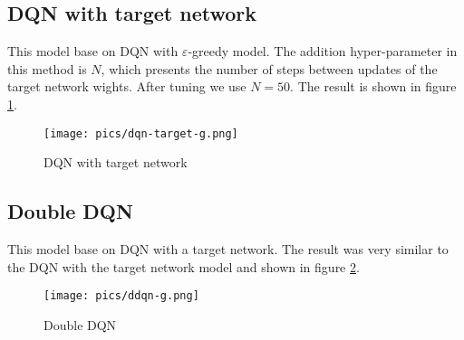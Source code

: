 \documentclass{article}
\begin{document}
	\subsection{DQN with target network}
	This model base on DQN with $ \varepsilon $-greedy model. The addition hyper-parameter in this method is $ N $, which presents the number of steps between updates of the target network wights. After tuning we use $ N= 50 $. The result is shown in figure \ref{dqn-target}.
	\begin{figure}[h!]
		\begin{center}
			\texttt{[image: pics/dqn-target-g.png]}
		\end{center}
		\caption{DQN with target network}
		\label{dqn-target}
	\end{figure}
	\subsection{Double DQN}
	This model base on DQN with a target network. The result was very similar to the DQN with the target network model and shown in figure \ref{ddqn}.
	\begin{figure}[h!]
		\begin{center}
			\texttt{[image: pics/ddqn-g.png]}
		\end{center}
		\caption{Double DQN}
		\label{ddqn}
	\end{figure}
\end{document}
